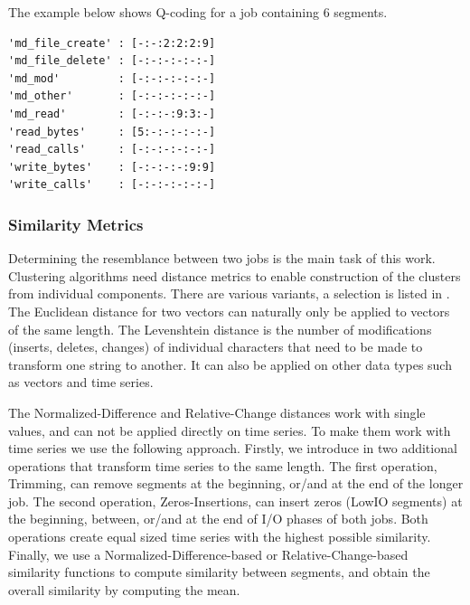\documentclass{jhps}
\begin{document}
The example below shows Q-coding for a job containing 6 segments.

\begin{lstlisting}[caption={Q-coding of a six segments long job.}]
'md_file_create' : [-:-:2:2:2:9]
'md_file_delete' : [-:-:-:-:-:-]
'md_mod'         : [-:-:-:-:-:-]
'md_other'       : [-:-:-:-:-:-]
'md_read'        : [-:-:-:9:3:-]
'read_bytes'     : [5:-:-:-:-:-]
'read_calls'     : [-:-:-:-:-:-]
'write_bytes'    : [-:-:-:-:9:9]
'write_calls'    : [-:-:-:-:-:-]
\end{lstlisting}

\subsubsection{Similarity Metrics}
Determining the resemblance between two jobs is the main task of this work.
Clustering algorithms need distance metrics to enable construction of the clusters from individual components.
There are various variants, a selection is listed in .
The Euclidean distance for two vectors can naturally only be applied to vectors of the same length.
The Levenshtein distance is the number of modifications (inserts, deletes, changes) of individual characters that need to be made to transform one string to another.
It can also be applied on other data types such as vectors and time series.

The Normalized-Difference and Relative-Change distances work with single values, and can not be applied directly on time series.
To make them work with time series we use the following approach.
Firstly, we introduce in  two additional operations that transform time series to the same length.
The first operation, Trimming, can remove segments at the beginning, or/and at the end of the longer job.
The second operation, Zeros-Insertions, can insert zeros (LowIO segments) at the beginning, between, or/and at the end of I/O phases of both jobs.
Both operations create equal sized time series with the highest possible similarity.
Finally, we use a Normalized-Difference-based or Relative-Change-based similarity functions to compute similarity between segments, and obtain the overall similarity by computing the mean.
\end{document}

